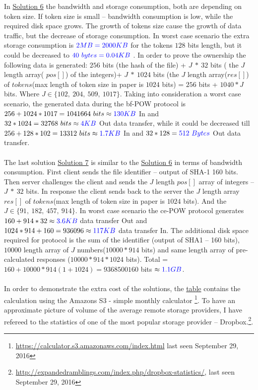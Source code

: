 \documentclass[12pt]{article}
\begin{document}
In \hyperref[sub:Soltuion6]{Solution 6} the bandwidth  and storage consumption, both are depending on token size. If token size is small -- bandwidth consumption is low, while the required disk space grows. The growth of tokens size cause the growth of data traffic, but the  decrease  of storage consumption. In worst case scenario the extra storage consumption is $\color{blue}2MB=2000KB$ for the tokens $128$ bits length, but it could be decreased to $\color{blue}40\ bytes=0.04KB$ . In order to prove the ownership the following data is generated: $256$ bits (the hash of the file)  +  $J\ *\ 32 $ bits ( the $J$ length array( $pos []$) of the integers)+ $J\ *\ 1024$ bits (the $J$ length array($res[]$) of $tokens$(max length of token size in paper is $1024$ bits) = $256$ bits + $1040*J$ bits. Where $J \in \{102,\ 204,\ 509,\ 1017\}$. Taking into consideration a worst case scenario, the generated data during the bf-POW protocol is $256 + 1024*1017 = 1041664\ bits\approx \color{blue}130KB$ In and $32*1024=32768\ bits\approx \color{blue}4KB $ Out data transfer, while it could be decreased till $256+128*102=13312\ bits\approx\color{blue}1.7KB$ In and $32*128= \color{blue}512\ Bytes$ Out data transfer.\\\\
The last solution \hyperref[sub:Soltuion7]{Solution 7} is similar to the \hyperref[sub:Soltuion6]{Solution 6} in terms of bandwidth consumption. First client sends the file identifier -- output of SHA-1 160 bits. Then server challenges the client and sends the $J$ length $pos[]$ array of integers -- $J\ *\ 32$ bits. In response the client  sends back to the server the $J$ length array $res[]$ of $tokens$(max length of token size in paper is $1024$ bits). And the  $J \in \{91,\ 182,\ 457,\ 914\}$. In worst case scenario the ce-POW protocol generates $160+914*32\approx \color{blue} 3.6 KB$ data transfer Out and  $1024*914+160=936096\approx \color{blue} 117 KB$ data transfer In. The additional disk space required for protocol is the sum of the identifier (output of SHA1 -- 160 bits), $10 000$ length array of $J$ numbers($10000*914$ bits) and same length array of pre-calculated responses ($10000*914*1024$ bits). Total = $160 + 10000*914(1+1024)=9368500160$ bits $\approx \color{blue} 1.1 GB $.\\\\
In order to demonstrate the extra cost of the solutions, the \hyperref[table:AWS-S3]{table} contains the calculation using the Amazons S3 - simple monthly calculator \footnote{\url{https://calculator.s3.amazonaws.com/index.html} last seen September 29, 2016}. To have an approximate  picture of  volume of the average remote storage providers, I have refereed to the statistics of one of the most popular storage provider -- Dropbox.\footnote{\url{http://expandedramblings.com/index.php/dropbox-statistics/}, last seen September 29, 2016 }.
\end{document}
